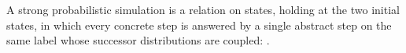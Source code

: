 \begin{definition}
  \label{def:strongsim}
  \leanok
  A strong probabilistic simulation is a relation on states, holding at the two initial states, in which every concrete step is answered by a single abstract step on the same label whose successor distributions are coupled: .
\end{definition}

